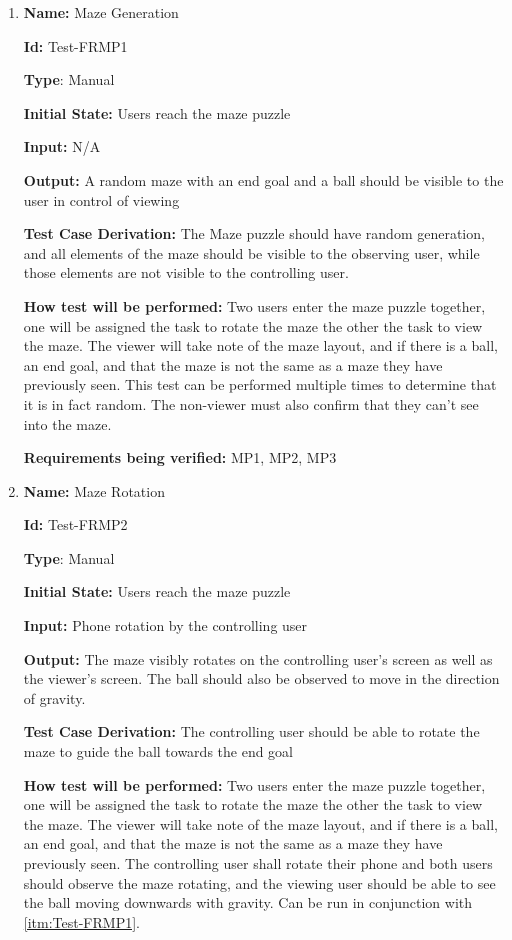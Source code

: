 \documentclass[12pt, titlepage]{article}
\begin{document}
\begin{enumerate}

\item{\textbf{Name:} Maze Generation} \label{itm:Test-FRMP1}

\textbf{Id:} Test-FRMP1

\textbf{Type}: Manual

\textbf{Initial State:} Users reach the maze puzzle

\textbf{Input:} N/A

\textbf{Output:} A random maze with an end goal and a ball should be visible to the user in control of viewing

\textbf{Test Case Derivation:} The Maze puzzle should have random generation, and all elements of the maze should be visible to the observing user, while those elements are not visible to the controlling user. 

\textbf{How test will be performed:} Two users enter the maze puzzle together, one will be assigned the task to rotate the maze the other the task to view the maze. The viewer will take note of the maze layout, and if there is a ball, an end goal, and that the maze is not the same as a maze they have previously seen. This test can be performed multiple times to determine that it is in fact random. The non-viewer must also confirm that they can't see into the maze. 

\textbf{Requirements being verified: } MP1, MP2, MP3

\item{\textbf{Name:} Maze Rotation} \label{itm:Test-FRMP2}

\textbf{Id:} Test-FRMP2

\textbf{Type}: Manual

\textbf{Initial State:} Users reach the maze puzzle

\textbf{Input:} Phone rotation by the controlling user

\textbf{Output:} The maze visibly rotates on the controlling user's screen as well as the viewer's screen. The ball should also be observed to move in the direction of gravity. 

\textbf{Test Case Derivation:} The controlling user should be able to rotate the maze to guide the ball towards the end goal

\textbf{How test will be performed:} Two users enter the maze puzzle together, one will be assigned the task to rotate the maze the other the task to view the maze. The viewer will take note of the maze layout, and if there is a ball, an end goal, and that the maze is not the same as a maze they have previously seen. The controlling user shall rotate their phone and both users should observe the maze rotating, and the viewing user should be able to see the ball moving downwards with gravity. Can be run in conjunction with \ref{itm:Test-FRMP1}.


\end{enumerate}
\end{document}
